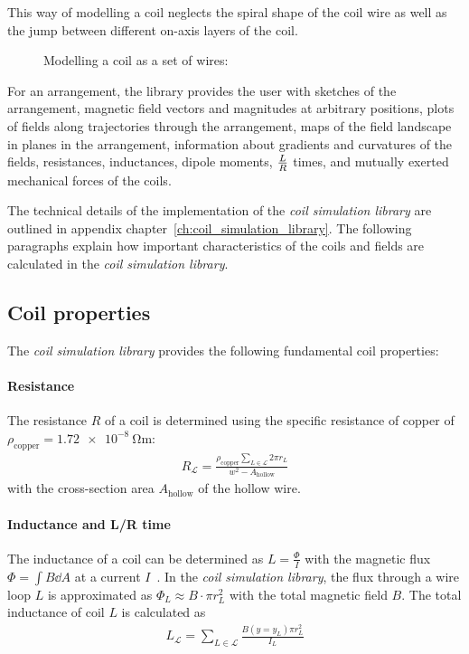 This way of modelling a coil neglects the spiral shape of the coil wire as well as the jump between different on-axis layers of the coil.

\begin{figure}
    \caption{Modelling a coil as a set of wires:
    }
    \label{fig:coil_model}
\end{figure}

For an arrangement, the library provides the user with sketches of the arrangement, magnetic field vectors and magnitudes at arbitrary positions, plots of fields along trajectories through the arrangement, maps of the field landscape in planes in the arrangement, information about gradients and curvatures of the fields, resistances, inductances, dipole moments, $L\over R$ times, and mutually exerted mechanical forces of the coils.

The technical details of the implementation of the \textit{coil simulation library} are outlined in appendix chapter~\ref{ch:coil_simulation_library}. The following paragraphs explain how important characteristics of the coils and fields are calculated in the \textit{coil simulation library}.

\subsection*{Coil properties}
The \textit{coil simulation library} provides the following fundamental coil properties:
\paragraph{Resistance}
The resistance $R$ of a coil is determined using the specific resistance of copper of $\rho_\text{copper} = \SI{1.72e-8}{\ohm\meter}$:
\begin{align}
    R_\mathcal{L} = \frac{\rho_\text{copper} \sum\limits_{L \in \mathcal{L}} 2\pi r_L} {w^2 - A_\text{hollow}}
\end{align}
with the cross-section area $A_\text{hollow}$ of the hollow wire.

\paragraph{Inductance and L/R time} The inductance of a coil can be determined as $L = \frac{\Phi}{I}$ with the magnetic flux $\Phi = \int B \dd A$ at a current $I$~\cite{demtroder_zeitlich_2013}. In the \textit{coil simulation library}, the flux through a wire loop $L$ is approximated as $\Phi_L \approx B \cdot \pi r_L^2$ with the total magnetic field $B$. The total inductance of coil $L$ is calculated as
\begin{align}
    L_\mathcal{L} = \sum\limits_{L \in \mathcal{L}} \frac{B(y = y_L) \pi r_L^2}{I_L}
\end{align}


